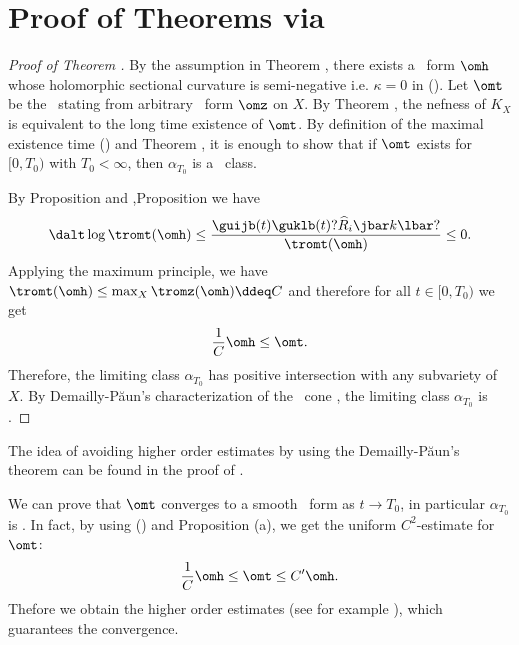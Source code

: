 \documentclass[12pt]{amsart}
\begin{document}
\section{Proof of Theorems  via \krf 
}
\begin{proof}[Proof of Theorem ]
By the assumption in Theorem , there exists  a \kahler \ form $\omh$ whose holomorphic sectional curvature is semi-negative i.e. $\kappa= 0$ in (). Let $\omt $ be the \krf \ stating from arbitrary \kahler \ form $\omz$ on $X$.  By Theorem , the nefness of $K_X$ is equivalent to the long time existence of $\omt$. By definition of the maximal existence time () and Theorem , it  is enough to show that if $\omt$ exists for $[0,T_0)$ with $T_0<\infty$, then $\alpha_{T_0}$ is  a \kahler \  class. 

By Proposition  and ,Proposition  we have 
\begin{align*}
\dalt \log \tromt(\omh ) \le \dfrac{ \guijb (t) \guklb (t) ?{\widehat{R}}_i\jbar k \lbar ? }{ \tromt (\omh ) } \le 0.
\end{align*}
Applying the maximum principle, we have $\tromt(\omh) \le \max_X \tromz(\omh )  \ddeq  C$ and therefore for all $t \in [0,T_0)$ we get 
\begin{align}\label{C2ineq}
	 \dfrac{1}{C}\omh \le \omt. 
\end{align}
Therefore, the limiting class $\alpha_{T_0}$ has positive intersection with any subvariety of $X$. 
By Demailly-P\u aun's characterization of the \kahler \ cone \citep[Main Theorem 0.1]{DemaillyPaun04}, the limiting class $\alpha_{T_0}$ is  \kahler. 
\end{proof}

\begin{remark}\label{higherrem}
The idea of avoiding higher order estimates by using the Demailly-P\u aun's theorem can be found in the proof of \citep[Theorem 1.1]{Zhang10ScalFTSingKRF}.

We can prove that $\omt$ converges to a smooth \kahler \ form as $t\rightarrow T_0$, in particular $\alpha_{T_0}$ is  \kahler.
In fact, by using () and  Proposition  (a), we get the uniform $C^2$-estimate for $\omt$:
\begin{align}\label{C2est}
	 \dfrac{1}{C}\omh \le \omt \le C^\prime \omh.
\end{align}
Thefore we obtain the higher order estimates (see for example \citep[3.2.16]{BEG13IntrotoKRF}), which guarantees the convergence.
\end{remark}
\end{document}
